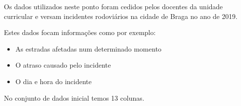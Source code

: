 Os dados utilizados neste ponto foram cedidos pelos docentes da unidade curricular e versam incidentes rodoviários na cidade de Braga no ano de 2019.

Estes dados focam informações como por exemplo:
\begin{itemize}
    \item As estradas afetadas num determinado momento
    \item O atraso causado pelo incidente
    \item O dia e hora do incidente
\end{itemize}

No conjunto de dados inicial temos 13 colunas.

